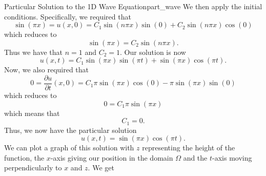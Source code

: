 \begin{ex}{Particular Solution to the 1D Wave Equation}{part_wave}
        We then apply the initial conditions. Specifically, we required that
        \[
        \sin(\pi x) = u(x,0) = C_1 \sin(n\pi x) \sin(0)+ C_2 \sin(n\pi x) \cos(0)
        \]
        which reduces to
        \[
        \sin(\pi x) = C_2 \sin(n\pi x).
        \]
        Thus we have that $n=1$ and $C_2=1$.  Our solution is now
        \[
        u(x,t)=C_1 \sin(\pi x)\sin(\pi t) +  \sin(\pi x)\cos(\pi t).
        \]
        Now, we also required that
        \[
        0=\frac{\partial u}{\partial t}(x,0) =C_1 \pi \sin(\pi x)\cos(0) - \pi \sin(\pi x) \sin(0)
        \]
        which reduces to
        \[
        0 = C_1 \pi \sin(\pi x)
        \]
        which means that
        \[
        C_1=0.
        \]
        Thus, we now have the particular solution
        \[
        \boxed{u(x,t)=\sin(\pi x)\cos(\pi t).}
        \]
        We can plot a graph of this solution with $z$ representing the height of the function, the $x$-axis giving our position in the domain $\Omega$ and the $t$-axis moving perpendicularly to $x$ and $z$. We get
\begin{figure}[H]
	\centering
	\def\svgwidth{0.75\columnwidth}
	
\end{figure}
        \end{ex}

% 
